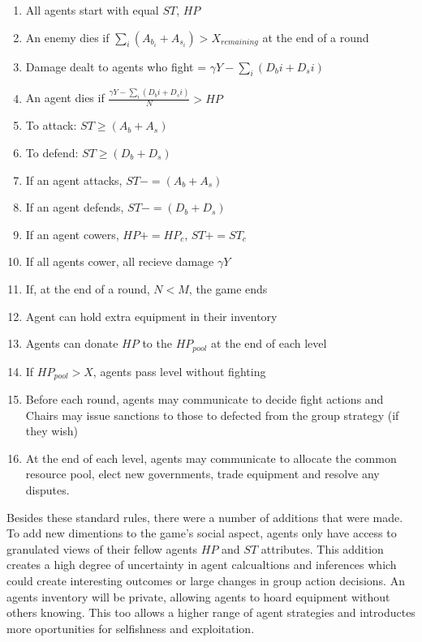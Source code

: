 \begin{enumerate}
    \item All agents start with equal $ST$, $HP$
    \item An enemy dies if $\sum_{i} (A_b_i + A_s_i) > X_{remaining}$ at the end of a round
    \item Damage dealt to agents who fight = $\gamma Y - \sum_{i} (D_bi + D_si)$ 
    \item An agent dies if $\frac{\gamma Y - \sum_{i} (D_bi + D_si)}{N} > HP$
    \item To attack: $ST \geq (A_b + A_s)$
    \item To defend: $ST \geq (D_b + D_s)$
    \item If an agent attacks, $ST -= (A_b + A_s)$
    \item If an agent defends, $ST -= (D_b + D_s)$
    \item If an agent cowers, $HP += HP_c$, $ST += ST_c$
    \item If all agents cower, all recieve damage $\gamma Y$
    \item If, at the end of a round, $N<M$, the game ends 

    \item Agent can hold extra equipment in their inventory
    \item Agents can donate $HP$ to the $HP_{pool}$ at the end of each level
    \item If $HP_{pool} > X$, agents pass level without fighting

    \item Before each round, agents may communicate to decide fight actions and Chairs may issue sanctions to those to defected from the group strategy (if they wish)
    \item At the end of each level, agents may communicate to allocate the common resource pool, elect new governments, trade equipment and resolve any disputes.


\end{enumerate}


Besides these standard rules, there were a number of additions that were made. To add new dimentions to the game's social aspect, agents only have access to granulated views of their fellow agents $HP$ and $ST$ attributes. This addition creates a high degree of uncertainty in agent calcualtions and inferences which could create interesting outcomes or large changes in group action decisions. An agents inventory will be private, allowing agents to hoard equipment without others knowing. This too allows a higher range of agent strategies and introductes more oportunities for selfishness and exploitation. 

